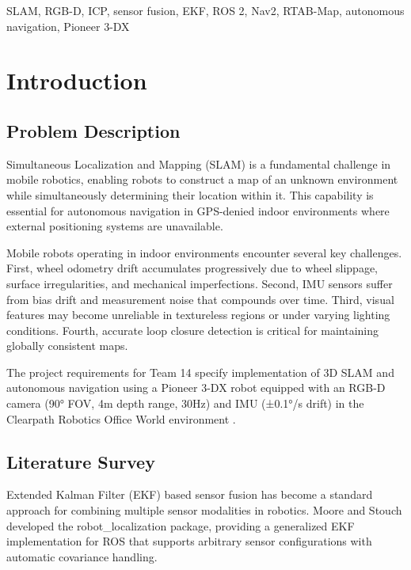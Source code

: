 \documentclass[conference]{IEEEtran}
\begin{document}
\begin{IEEEkeywords}
SLAM, RGB-D, ICP, sensor fusion, EKF, ROS 2, Nav2, RTAB-Map, autonomous navigation, Pioneer 3-DX
\end{IEEEkeywords}

\section{Introduction}

\subsection{Problem Description}

Simultaneous Localization and Mapping (SLAM) is a fundamental challenge in mobile robotics, enabling robots to construct a map of an unknown environment while simultaneously determining their location within it. This capability is essential for autonomous navigation in GPS-denied indoor environments where external positioning systems are unavailable.

Mobile robots operating in indoor environments encounter several key challenges. First, wheel odometry drift accumulates progressively due to wheel slippage, surface irregularities, and mechanical imperfections. Second, IMU sensors suffer from bias drift and measurement noise that compounds over time. Third, visual features may become unreliable in textureless regions or under varying lighting conditions. Fourth, accurate loop closure detection is critical for maintaining globally consistent maps.

The project requirements for Team 14 specify implementation of 3D SLAM and autonomous navigation using a Pioneer 3-DX robot equipped with an RGB-D camera (90° FOV, 4m depth range, 30Hz) and IMU (±0.1°/s drift) in the Clearpath Robotics Office World environment \cite{cpr_gazebo}.

\subsection{Literature Survey}

Extended Kalman Filter (EKF) based sensor fusion has become a standard approach for combining multiple sensor modalities in robotics. Moore and Stouch \cite{robot_localization} developed the robot\_localization package, providing a generalized EKF implementation for ROS that supports arbitrary sensor configurations with automatic covariance handling.
\end{document}
